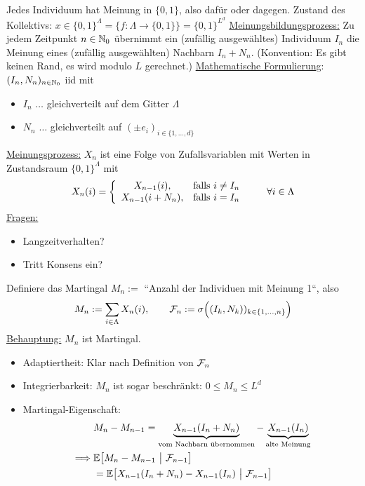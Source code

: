 \begin{beisp}[Wählermodell]
Jedes Individuum hat Meinung in $\lbrace0,1\rbrace$, also dafür oder dagegen. Zustand des Kollektivs:
$x\in\lbrace0,1\rbrace^{\Lambda}=\big\lbrace f:\Lambda\to\lbrace 0,1\rbrace\big\rbrace=\lbrace0,1\rbrace^{L^d}$\nl
\ul{Meinungsbildungsprozess:} Zu jedem Zeitpunkt $n\in\mathbb{N}_0$ übernimmt ein (zufällig ausgewähltes) Individuum $I_n$ die Meinung eines (zufällig ausgewählten) Nachbarn $I_n+N_n$. (Konvention: Es gibt keinen Rand, es wird modulo $L$ gerechnet.)\nl
\ul{Mathematische Formulierung}: $(I_n,N_n)_{n\in\mathbb{N}_0}$ iid mit 
\begin{itemize}
\item $I_n$ $\ldots$ gleichverteilt auf dem Gitter $\Lambda$
\item $N_n$ $\ldots$ gleichverteilt auf $(\pm e_i)_{i\in\lbrace1,\ldots,d\rbrace}$
\end{itemize}
\ul{Meinungsprozess:} $X_n$ ist eine Folge von Zufallsvariablen mit Werten in Zustandsraum $\lbrace0,1\rbrace^\Lambda$ mit
\begin{align*}
X_n(i)=\left\lbrace\begin{array}{cl}
X_{n-1}(i), &\text{falls } i\neq I_n\\
X_{n-1}(i+N_n),&\text{falls } i=I_n
\end{array}\right.\qquad\forall i\in\Lambda
\end{align*}
\ul{Fragen:}
\begin{itemize}
	\item Langzeitverhalten?
	\item Tritt Konsens ein?
\end{itemize}
Definiere das Martingal $M_n:=$ ``Anzahl der Individuen mit Meinung 1``, also
\begin{align*}
M_n:=\sum\limits_{i\in\Lambda} X_n(i),\qquad \mathcal{F}_n:=\sigma\Big((I_k,N_k))_{k\in\lbrace1,\ldots,n\rbrace}\Big)
\end{align*}
\ul{Behauptung:} $M_n$ ist Martingal.
\begin{itemize}
\item Adaptiertheit: Klar nach Definition von $\mathcal{F}_n$
\item Integrierbarkeit: $M_n$ ist sogar beschränkt: $0\leq M_n\leq L^d$
\item Martingal-Eigenschaft:
\begin{align*}
&M_n-M_{n-1}
=\underbrace{X_{n-1}(I_n+N_n)}_{\text{vom Nachbarn übernommen}}-\underbrace{X_{n-1}(I_n)}_{\text{alte Meinung}}\\
\implies&\E\big[M_n-M_{n-1}~\big|~\F_{n-1}\big]\\
&=\E\big[X_{n-1}(I_n+N_n)-X_{n-1}(I_n)~\big|~\F_{n-1}\big]\\

\end{align*}
\end{itemize}
\end{beisp}
